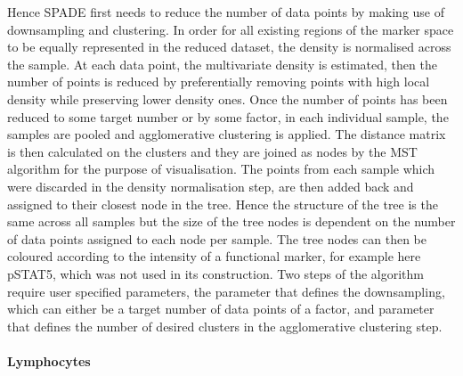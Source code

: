 Hence \gls{SPADE} first needs to reduce the number of data points by making use of downsampling and clustering.
In order for all existing regions of the marker space to be equally represented in the reduced dataset,
the density is normalised across the sample.
At each data point, the multivariate density is estimated, then the number of points is reduced by preferentially removing 
points with high local density while preserving lower density ones.
Once the number of points has been reduced to some target number or by some factor, in each individual sample,
the samples are pooled and agglomerative clustering is applied.
The distance matrix is then calculated on the clusters and they are joined as nodes by the \acrfull{MST} algorithm for the purpose of visualisation.
The points from each sample which were discarded in the density normalisation step, are then added back and assigned to their closest node in the tree.
Hence the structure of the tree is the same across all samples but the size of the tree nodes 
is dependent on the number of data points assigned to each node per sample.
The tree nodes can then be coloured according to the intensity of a functional marker, for example here pSTAT5,
which was not used in its construction.
Two steps of the algorithm require user specified parameters, the parameter that defines the downsampling,
which can either be a target number of data points of a factor, and parameter that defines the number of desired clusters
in the agglomerative clustering step.

\paragraph{Lymphocytes}


